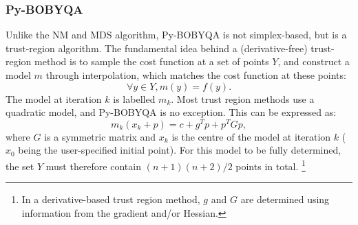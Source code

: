 \subsubsection{Py-BOBYQA}

Unlike the NM and MDS algorithm, Py-BOBYQA is not simplex-based, but is a trust-region algorithm.\autocite{Powell2009Proc,Cartis2019ACMTMS}
The fundamental idea behind a (derivative-free) trust-region method is to sample the cost function at a set of points $Y$, and construct a model $m$ through interpolation, which matches the cost function at these points:
\begin{equation}
    \label{eq:trust_region_model}
    \forall y \in Y, m(y) = f(y).
\end{equation}
The model at iteration $k$ is labelled $m_k$.
Most trust region methods use a quadratic model, and Py-BOBYQA is no exception.
This can be expressed as:
\begin{equation}
    \label{eq:trust_region_quadratic_model}
    m_k(x_k + p) = c + g^Tp + p^TGp,
\end{equation}
where $G$ is a symmetric matrix and $x_k$ is the centre of the model at iteration $k$ ($x_0$ being the user-specified initial point).
For this model to be fully determined, the set $Y$ must therefore contain $(n+1)(n+2)/2$ points in total.%
\footnote{In a derivative-based trust region method, $g$ and $G$ are determined using information from the gradient and/or Hessian.}

